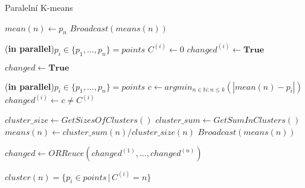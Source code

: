 \documentclass[a4paper, 11pt, fleqn]{scrartcl}
\begin{document}
      \begin{algorithm}
        \label{algo:fast}
        \SetAlgoLined
        \DontPrintSemicolon
        \caption{Paralelní K-means}

        \vspace*{2mm}

        {
          $mean(n) \leftarrow p_n$\;
          $Broadcast(means(n))$\;
        }

        \vspace*{2mm}

        \ForAll(\textbf{in parallel}){$p_i \in \{p_1, \dots, p_n\} = points$}
        {
          $C^{(i)} \leftarrow 0$ 
          $changed^{(i)} \leftarrow \textbf{True}$ 
        }

        \vspace*{2mm}

        $changed \leftarrow \textbf{True}$\;
        {
          \ForAll(\textbf{in parallel}){$p_i \in \{p_1, \dots, p_n\} = points$}
          {
            $c \leftarrow arg min_{n \in \mathbb{N} : n \leq k}(|mean(n) - p_i|)$\;
            $changed^{(i)} \leftarrow c \neq C^{(i)}$ 
          }

          $cluster\_size \leftarrow GetSizesOfClusters()$ 
          $cluster\_sum \leftarrow GetSumInClusters()$ 
          {
            $means(n) \leftarrow cluster\_sum(n) / cluster\_size(n)$\;
            $Broadcast(means(n))$\;
          }

          $changed \leftarrow ORReuce(changed^{(1)}, \dots, changed^{(n)})$ 

        }

        \vspace*{2mm}

        {
          $cluster(n) = \{p_i \in points\,|\, C^{(i)} = n\}$\;
        }

        \vspace*{2mm}


      \end{algorithm}
\end{document}

